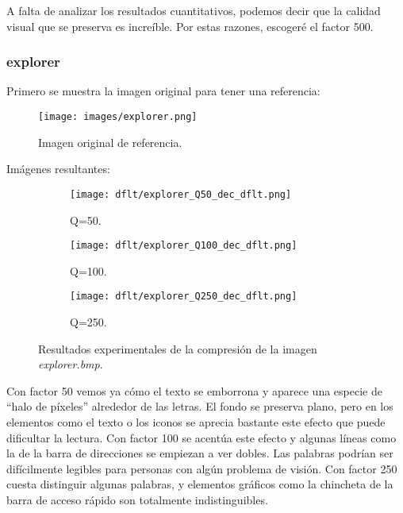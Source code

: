 \documentclass[12pt,a4paper]{article}
\begin{document}
A falta de analizar los resultados cuantitativos, podemos decir que la calidad visual que se preserva es increíble. Por estas razones, escogeré el factor 500.\\

\subsubsection{explorer}
Primero se muestra la imagen original para tener una referencia:
\begin{figure}[H]
    \centering
    \texttt{[image: images/explorer.png]}
    \caption[Referencia - explorer]{Imagen original de referencia.}
    
\end{figure}
    
    \vspace{0.5cm}

Imágenes resultantes:
\begin{figure}[H]
    
    \begin{subfigure}{0.30\textwidth}
        \centering
        \texttt{[image: dflt/explorer\_Q50\_dec\_dflt.png]}
        \caption{Q=50.}
        
    \end{subfigure}
    \hfill
    \begin{subfigure}{0.30\textwidth}
        \centering
        \texttt{[image: dflt/explorer\_Q100\_dec\_dflt.png]}
        \caption{Q=100.}
        
    \end{subfigure}
    \hfill
    \begin{subfigure}{0.30\textwidth}
        \centering
        \texttt{[image: dflt/explorer\_Q250\_dec\_dflt.png]}
        \caption{Q=250.}
        
    \end{subfigure}
    
    \caption[Resultados experimentales - explorer]{Resultados experimentales de la compresión de la imagen \textit{explorer.bmp}.}
    
\end{figure}

Con factor 50 vemos ya cómo el texto se emborrona y aparece una especie de ``halo de píxeles'' alrededor de las letras. El fondo se preserva plano, pero en los elementos como el texto o los iconos se aprecia bastante este efecto que puede dificultar la lectura. Con factor 100 se acentúa este efecto y algunas líneas como la de la barra de direcciones se empiezan a ver dobles. Las palabras podrían ser difícilmente legibles para personas con algún problema de visión. Con factor 250 cuesta distinguir algunas palabras, y elementos gráficos como la chincheta de la barra de acceso rápido son totalmente indistinguibles.\\
\end{document}
